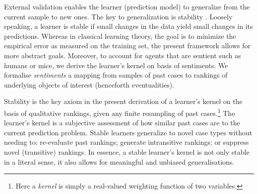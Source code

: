 \documentclass[12pt,a4paper,twoside]{article}
\newcommand{\gsii}{$\textup{GS03}$}
\begin{document}
  External validation enables the learner (prediction model) to generalize from
  the current sample to new ones. The key to generalization is stability
  \citep{Busquet-Elisseeff-stability-and-generalization,Poggio-stability-and-predictivity}.
  Loosely speaking, a learner is stable if small changes in the data yield
  small changes in its predictions.  Whereas in classical learning theory, the
  goal is to minimize the empirical error as measured on the training set, the
  present framework allows for more abstract goals. Moreover, to account for
  agents that are sentient such as humans or mice, we derive the learner's
  kernel on basis of {sentiments}.  We formalise \emph{sentiments} a mapping
  from samples of past cases to rankings of underlying objects of interest
  (henceforth eventualities).
  
  Stability is the key axiom in the present derivation of a learner's kernel on
  the basis of qualitative rankings, given any finite resampling of past
  cases.\footnote{Here a \emph{kernel} is simply a real-valued weighting
  function of two variables.} The learner's kernel is a subjective assessment
  of how similar past cases are to the current prediction problem.  Stable
  learners generalize to novel case types without needing to: re-evaluate past
  rankings; generate intransitive rankings; or suppress novel (transitive)
  rankings. In essence, a stable learner's kernel is not only stable in a
  literal sense, it also allows for meaningful and unbiased generalisations.
 

\end{document}
